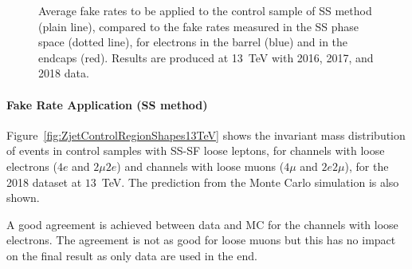 \begin{figure}[!htb]
\begin{center}
\caption{Average fake rates to be applied to the control sample of SS method (plain line), compared to
  the fake rates measured in the SS phase space (dotted line), for electrons in the barrel (blue) and in the endcaps (red).
  Results are produced at 13~TeV with 2016, 2017, and 2018 data.
}
\label{fig:FRAAcorrected}
\end{center}
\end{figure}

\paragraph{Fake Rate Application (SS method)}
Figure~\ref{fig:ZjetControlRegionShapes13TeV} shows the invariant mass
distribution of events in control samples with SS-SF loose leptons,
for channels with loose electrons ($4e$ and $2\mu2e$) and channels
with loose muons ($4\mu$ and $2e2\mu$), for the 2018 dataset at $13$~TeV. 
The prediction from the Monte Carlo simulation is also shown.

A good agreement is achieved between data and MC for the channels
with loose electrons. The agreement is not as good for loose muons
but this has no impact on the final result as only data are used in the end.  


